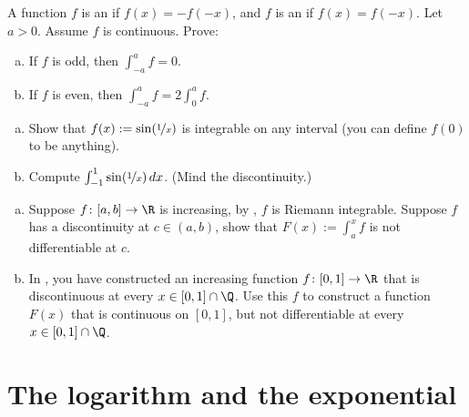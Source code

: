 \documentclass[12pt]{book}
\begin{document}
\begin{exercise}
A function $f$ is an \emph{} if $f(x) = -f(-x)$,
and $f$ is an \emph{} if $f(x) = f(-x)$.
Let $a >
0$.  
Assume $f$ is continuous.  
Prove: 
\begin{enumerate}[a)]
 \item If $f$ is odd, then $\int_{-a}^a f
= 0$.
 \item If $f$ is even, then $\int_{-a}^a f = 2 \int_0^a f$.
\end{enumerate}
\end{exercise}

\begin{exercise}
\begin{enumerate}[a)]
 \item Show that $f(x) := \sin(\nicefrac{1}{x})$
is integrable on any interval (you can define $f(0)$ to be anything).
  \item Compute $\int_{-1}^1 \sin(\nicefrac{1}{x})\,dx$.
(Mind the discontinuity.)
\end{enumerate}
\end{exercise}

\begin{exercise}
\begin{enumerate}[a)]
 \item Suppose $f \colon [a,b] \to \R$ is increasing, by
,
$f$ is Riemann integrable.
Suppose $f$ has a discontinuity at $c \in
(a,b)$, show that $F(x) := \int_a^x f$ is not differentiable at $c$.
  \item In , you have constructed an increasing
function $f \colon [0,1] \to \R$ that is discontinuous at every
$x \in [0,1] \cap \Q$.
Use this $f$ to construct a function $F(x)$ that is
continuous on $[0,1]$, but not differentiable at every $x \in [0,1] \cap \Q$.
\end{enumerate}
\end{exercise}


\sectionnewpage
\section{The logarithm and the exponential}
\label{sec:logandexp}

\end{document}
